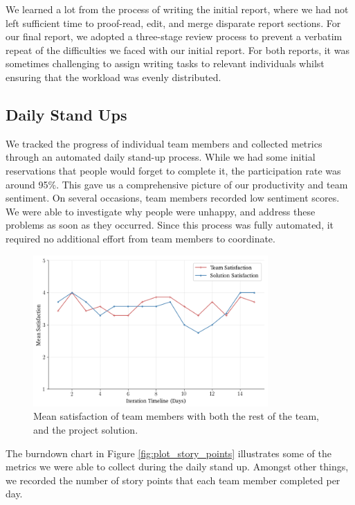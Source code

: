 We learned a lot from the process of writing the initial report, where we had not left sufficient time to proof-read, edit, and merge disparate report sections. For our final report, we adopted a three-stage review process to prevent a verbatim repeat of the difficulties we faced with our initial report. For both reports, it was sometimes challenging to assign writing tasks to relevant individuals whilst ensuring that the workload was evenly distributed.

\subsection{Daily Stand Ups}
\label{sec:standups}
We tracked the progress of individual team members and collected metrics through an automated daily stand-up process. While we had some initial reservations that people would forget to complete it, the participation rate was around 95\%. This gave us a comprehensive picture of our productivity and team sentiment. On several occasions, team members recorded low sentiment scores. We were able to investigate why people were unhappy, and address these problems as soon as they occurred. Since this process was fully automated, it required no additional effort from team members to coordinate.

\begin{figure}[h!]
	\centering
	\includegraphics[width=0.8\textwidth]{images/plot_satisfaction}
	\caption{Mean satisfaction of team members with both the rest of the team, and the project solution.}
	\label{fig:plot_satisfaction}
\end{figure}

The burndown chart in Figure \ref{fig:plot_story_points} illustrates some of the metrics we were able to collect during the daily stand up. Amongst other things, we recorded the number of story points that each team member completed per day. 

